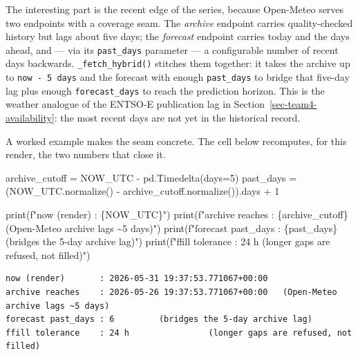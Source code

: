 \documentclass[
  english,
  letterpaper,
]{scrbook}
\newenvironment{Shaded}{\begin{snugshade}}{\end{snugshade}}
\newcommand{\BuiltInTok}[1]{\textcolor[rgb]{0.00,0.23,0.31}{#1}}
\newcommand{\DecValTok}[1]{\textcolor[rgb]{0.68,0.00,0.00}{#1}}
\newcommand{\NormalTok}[1]{\textcolor[rgb]{0.00,0.23,0.31}{#1}}
\newcommand{\OperatorTok}[1]{\textcolor[rgb]{0.37,0.37,0.37}{#1}}
\newcommand{\SpecialCharTok}[1]{\textcolor[rgb]{0.37,0.37,0.37}{#1}}
\newcommand{\SpecialStringTok}[1]{\textcolor[rgb]{0.13,0.47,0.30}{#1}}
\begin{document}
The interesting part is the recent edge of the series, because
Open-Meteo serves two endpoints with a coverage seam. The \emph{archive}
endpoint carries quality-checked history but lags about five days; the
\emph{forecast} endpoint carries today and the days ahead, and --- via
its \texttt{past\_days} parameter --- a configurable number of recent
days backwards. \texttt{\_fetch\_hybrid()} stitches them together: it
takes the archive up to \texttt{now\ -\ 5\ days} and the forecast with
enough \texttt{past\_days} to bridge that five-day lag plus enough
\texttt{forecast\_days} to reach the prediction horizon. This is the
weather analogue of the ENTSO-E publication lag in
Section~\ref{sec-team4-availability}: the most recent days are not yet
in the historical record.

A worked example makes the seam concrete. The cell below recomputes, for
this render, the two numbers that close it.

\protect{}\label{team4-weather-window}
\begin{Shaded}
\begin{Highlighting}[]
\NormalTok{archive\_cutoff }\OperatorTok{=}\NormalTok{ NOW\_UTC }\OperatorTok{{-}}\NormalTok{ pd.Timedelta(days}\OperatorTok{=}\DecValTok{5}\NormalTok{)}
\NormalTok{past\_days }\OperatorTok{=}\NormalTok{ (NOW\_UTC.normalize() }\OperatorTok{{-}}\NormalTok{ archive\_cutoff.normalize()).days }\OperatorTok{+} \DecValTok{1}

\BuiltInTok{print}\NormalTok{(}\SpecialStringTok{f"now (render)       : }\SpecialCharTok{\{}\NormalTok{NOW\_UTC}\SpecialCharTok{\}}\SpecialStringTok{"}\NormalTok{)}
\BuiltInTok{print}\NormalTok{(}\SpecialStringTok{f"archive reaches    : }\SpecialCharTok{\{}\NormalTok{archive\_cutoff}\SpecialCharTok{\}}\SpecialStringTok{   (Open{-}Meteo archive lags \textasciitilde{}5 days)"}\NormalTok{)}
\BuiltInTok{print}\NormalTok{(}\SpecialStringTok{f"forecast past\_days : }\SpecialCharTok{\{}\NormalTok{past\_days}\SpecialCharTok{\}}\SpecialStringTok{         (bridges the 5{-}day archive lag)"}\NormalTok{)}
\BuiltInTok{print}\NormalTok{(}\SpecialStringTok{f"ffill tolerance    : 24 h                (longer gaps are refused, not filled)"}\NormalTok{)}
\end{Highlighting}
\end{Shaded}

\begin{verbatim}
now (render)       : 2026-05-31 19:37:53.771067+00:00
archive reaches    : 2026-05-26 19:37:53.771067+00:00   (Open-Meteo archive lags ~5 days)
forecast past_days : 6         (bridges the 5-day archive lag)
ffill tolerance    : 24 h                (longer gaps are refused, not filled)
\end{verbatim}
\end{document}
